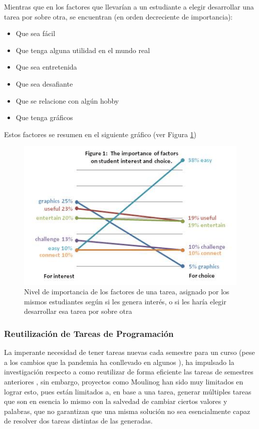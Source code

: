 \documentclass[letterpaper,12pt]{article}
\begin{document}
Mientras que en los factores que llevarían a un estudiante a elegir desarrollar una tarea por sobre otra, se encuentran (en orden decreciente de importancia):

\begin{itemize}
  \item Que sea fácil
  \item Que tenga alguna utilidad en el mundo real
  \item Que sea entretenida
  \item Que sea desafiante
  \item Que se relacione con algún hobby
  \item Que tenga gráficos
\end{itemize}

Estos factores se resumen en el siguiente gráfico (ver Figura \ref{elecciones})

\begin{figure}[H]
  \centering
  \includegraphics[width=1\textwidth]{elecciones.png}
  \caption{Nivel de importancia de los factores de una tarea, asignado por los mismos estudiantes según si les genera interés, o si les haría elegir desarrollar esa tarea por sobre otra \cite{10.5555/1968521.1968545}}
  \label{elecciones}
\end{figure}

\subsubsection{Reutilización de Tareas de Programación}

La imperante necesidad de tener tareas nuevas cada semestre para un curso (pese a los cambios que la pandemia ha conllevado en algunos \cite{10.1145/3456565.3461439}), ha impulsado la investigación respecto a como reutilizar de forma eficiente las tareas de semestres anteriores \cite{10.1145/3477429}, sin embargo, proyectos como Moulinog \cite{10.1145/3414080.3414100} han sido muy limitados en lograr esto, pues están limitados a, en base a una tarea, generar múltiples tareas que son en esencia lo mismo con la salvedad de cambiar ciertos valores y palabras, que no garantizan que una misma solución no sea esencialmente capaz de resolver dos tareas distintas de las generadas.
\end{document}
